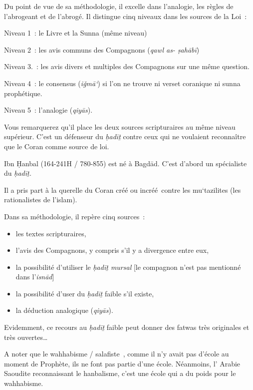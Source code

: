 Du point de vue de sa méthodologie, il excelle dans l'analogie, les
règles de l'abrogeant et de l'abrogé. Il distingue cinq niveaux dans les
sources de la Loi~:

Niveau 1~: le Livre et la Sunna (même niveau)

Niveau 2~: les avis communs des Compagnons (\emph{qawl as- ṣahābī})

Niveau 3.~: les avis divers et multiples des Compagnons sur une même
question.

Niveau 4~: le consensus (\emph{iǧmā`}) si l'on ne trouve ni verset
coranique ni sunna prophétique.

Niveau 5~: l'analogie (\emph{qiyās}).

Vous remarquerez qu'il place les deux sources scripturaires au même
niveau supérieur. C'est un défenseur du \emph{ḥadīṯ} contre ceux qui ne
voulaient reconnaître que le Coran comme source de loi.


Ibn Ḥanbal (164-241H / 780-855) est né à Bagdād. C'est d'abord un
spécialiste du \emph{ḥadīṯ.}

Il a pris part à la querelle du Coran créé ou incréé~contre les
mu`tazilites (les rationalistes de l'islam).

Dans sa méthodologie, il repère cinq sources~:

\begin{itemize}
\item
  les textes scripturaires,
\item
  l'avis des Compagnons, y compris s'il y a divergence entre eux,
\item
  la possibilité d'utiliser le \emph{ḥadīṯ mursal} {[}le compagnon n'est
  pas mentionné dans l'\emph{isnād}{]}
\item
  la possibilité d'user du \emph{ḥadīṯ} faible s'il existe,
\item
  la déduction analogique (\emph{qiyās}).
\end{itemize}

Evidemment, ce recours au \emph{ḥadīṯ} faible peut donner des fatwas
très originales et très ouvertes\ldots{}

A noter que le wahhabisme / salafiste~, comme il n'y avait pas d'école au moment de
  Prophète, ils ne font pas partie d'une école. Néanmoins, l' Arabie Saoudite reconnaissant le hanbalisme, c'est une école qui a du poids pour le wahhabisme.
  
